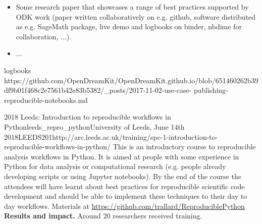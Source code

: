 \begin{Aim 1}
\begin{Aim 2}
\begin{itemize}
 OpenDreamKit member, Tania Allard, ran a hands-on workshop on Jupyter notebooks for reproducible research. This workshop focused on the use of Jupyter notebooks as a means to disseminate reproducible analysis workflows and how this can be leveraged using tools such as nbdime and nbval. Both nbdime and nbval were developed by members of the OpenDreamKit project as a response to the growing popularity of the Jupyter notebooks and the lack of native integration between these technologies and existing version control and validation/testing tools.

An exceptional win was that this workshop was, in fact, one of the most popular events of the conference and we were asked to run it twice as it was massively oversubscribed. This reflects, on one hand, the popularity of Jupyter notebooks due to the boom of literate programming and its focus on human-readable code. Allowing researchers to share their findings and the code they used along the way in a compelling narrative. On the other hand, it demonstrates the importance of reproducible science and the need for tools that help RSE and researchers to achieve this goal, which aligns perfectly with the goals of OpenDreamKit.

The workshop revolved around 3 main topics:
    Version control of the Jupyter notebooks
    Notebooks validation
    The basics of reproducible software practices.
    
    https://github.com/OpenDreamKit/OpenDreamKit.github.io/blob/6faf6eb2f1532f342f86c8da633078067ca40c85/_posts/2018-03-07-opendreamkit-at-     
    the-rse-conference.md

 
\item Some research paper that showcases a range of best practices supported by ODK work (paper written collaboratively on e.g. github,
  software distributed as e.g. SageMath package, live demo and logbooks on binder, nbdime for collaboration, ...).
\item ...
\end{itemize}

      logbooks 
      https://github.com/OpenDreamKit/OpenDreamKit.github.io/blob/651460262b39df9b01f468c2e7561b42e83b5382/_posts/2017-11-02-use-case-
      publishing-reproducible-notebooks.md
      

\begin{event}{2018 Leeds: Introduction to reproducible workflows in Python}{leeds_repro_python}{University of Leeds, June 14th 2018}{LEEDS}{20}{1}{http://arc.leeds.ac.uk/training/spc-1-introduction-to-reproducible-workflows-in-python/}
This is an introductory course to reproducible analysis workflows in Python. It is aimed at people with some experience in Python for data analysis or computational research (e.g. people already developing scripts or using Jupyter notebooks). By the end of the course the attendees will have learnt about best practices for reproducible scientific code development and should be able to implement these techniques to their day to day workflows.
Materials at \url{https://github.com/trallard/ReproduciblePython}
\textbf{Results and impact.} Around 20 researchers received training.



\end{event}
\end{Aim 2}
\end{Aim 1}
